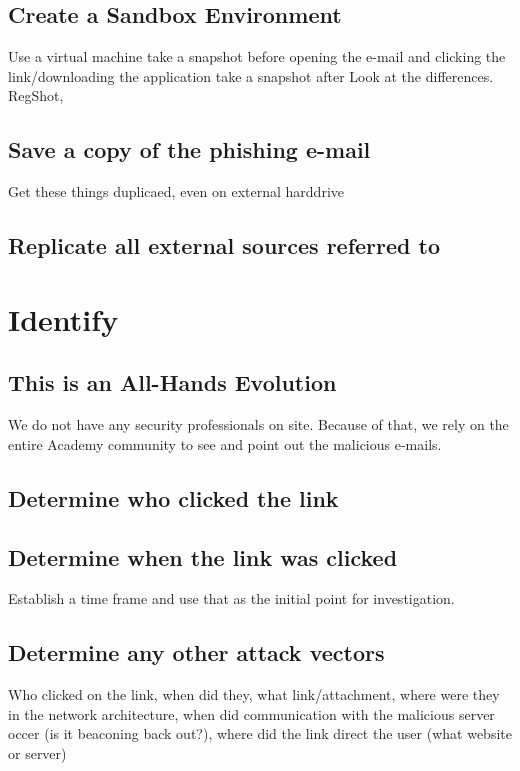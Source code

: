 \documentclass[11pt]{article}
\begin{document}
	\subsection{Create a Sandbox Environment}
	\label{Sandbox_Environment}

	Use a virtual machine
	take a snapshot before opening the e-mail and clicking the link/downloading the application
	take a snapshot after
	Look at the differences. RegShot, 

	\subsection{Save a copy of the phishing e-mail}
	\label{Save_a_copy}
	Get these things duplicaed, even on external harddrive


	\subsection{Replicate all external sources referred to}
	\label{Replicate all external sources}


	\section{Identify}
	\subsection{This is an All-Hands Evolution}
	We do not have any security professionals on site. Because of that, we rely on the entire Academy community to see and point out the malicious e-mails.

	\subsection{Determine who clicked the link}
	\subsection{Determine when the link was clicked}
	Establish a time frame and use that as the initial point for investigation.

	\subsection{Determine any other attack vectors}
	Who clicked on the link, when did they, what link/attachment, where were they in the network architecture, when did communication with the malicious server occer (is it beaconing back out?), where did the link direct the user (what website or server)
\end{document}
